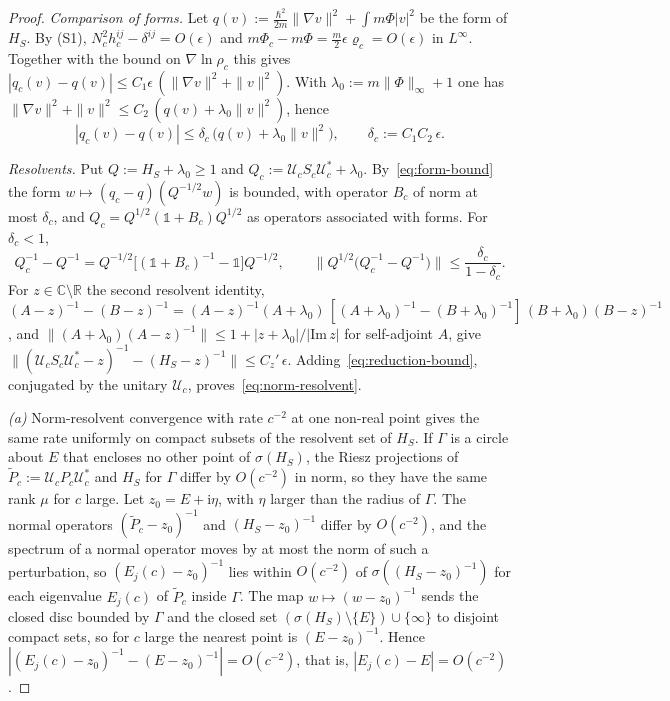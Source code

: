 \documentclass[%
 aip,
 jmp,
 amsmath,amssymb,
 reprint, onecolumn
]{revtex4-1}
\theoremstyle{definition}
\theoremstyle{remark}
\newcommand{\R}{\mathbb{R}}
\newcommand{\C}{\mathbb{C}}
\newcommand{\one}{\mathds{1}}
\newcommand{\rmi}{\mathrm{i}}
\begin{document}
\begin{proof}
\emph{Comparison of forms.} Let $q(v):=\frac{\hbar^2}{2m}\|\nabla v\|^2+
\int m\Phi|v|^2$ be the form of $H_S$. By (S1),
$N_c^2h_c^{ij}-\delta^{ij}=O(\epsilon)$ and $m\Phi_c-m\Phi=\frac m2
\epsilon\varrho_c=O(\epsilon)$ in $L^\infty$. Together with the bound
on $\nabla\ln\rho_c$ this gives $|q_c(v)-q(v)|\leq C_1\epsilon\,
(\|\nabla v\|^2+\|v\|^2)$. With $\lambda_0:=m\|\Phi\|_\infty+1$ one has
$\|\nabla v\|^2+\|v\|^2\leq C_2\,(q(v)+\lambda_0\|v\|^2)$, hence
\begin{equation}\label{eq:form-bound}
|q_c(v)-q(v)|\leq\delta_c\,\bigl(q(v)+\lambda_0\|v\|^2\bigr),\qquad
\delta_c:=C_1C_2\,\epsilon .
\end{equation}

\emph{Resolvents.} Put $Q:=H_S+\lambda_0\geq1$ and $Q_c:=\mathcal{U}_c
S_c\mathcal{U}_c^*+\lambda_0$. By~\eqref{eq:form-bound} the form
$w\mapsto(q_c-q)(Q^{-1/2}w)$ is bounded, with operator $B_c$ of norm at
most $\delta_c$, and $Q_c=Q^{1/2}(\one+B_c)Q^{1/2}$ as operators
associated with forms. For $\delta_c<1$,
\begin{equation}\label{eq:factorised-resolvent}
Q_c^{-1}-Q^{-1}=Q^{-1/2}\bigl[(\one+B_c)^{-1}-\one\bigr]Q^{-1/2},
\qquad
\bigl\|Q^{1/2}\bigl(Q_c^{-1}-Q^{-1}\bigr)\bigr\|\leq\frac{\delta_c}{1-\delta_c}.
\end{equation}
For $z\in\C\setminus\R$ the second resolvent identity,
$(A-z)^{-1}-(B-z)^{-1}=(A-z)^{-1}(A+\lambda_0)\,[(A+\lambda_0)^{-1}-(B+
\lambda_0)^{-1}]\,(B+\lambda_0)(B-z)^{-1}$, and $\|(A+\lambda_0)(A-z)^{-1}\|
\leq1+|z+\lambda_0|/|\mathrm{Im}\,z|$ for self-adjoint $A$, give
$\|(\mathcal{U}_cS_c\mathcal{U}_c^*-z)^{-1}-(H_S-z)^{-1}\|\leq C_z'\,
\epsilon$. Adding~\eqref{eq:reduction-bound}, conjugated by the unitary
$\mathcal{U}_c$, proves~\eqref{eq:norm-resolvent}.

\emph{(a)} Norm-resolvent convergence with rate $c^{-2}$ at one
non-real point gives the same rate uniformly on compact subsets of the
resolvent set of $H_S$. If $\Gamma$ is a circle about $E$ that encloses
no other point of $\sigma(H_S)$, the Riesz projections of
$\tilde P_c:=\mathcal{U}_cP_c\mathcal{U}_c^*$ and $H_S$ for $\Gamma$ differ
by $O(c^{-2})$ in norm, so they have the same rank $\mu$ for $c$ large.
Let $z_0=E+\rmi\eta$, with $\eta$ larger than the radius of $\Gamma$.
The normal operators $(\tilde P_c-z_0)^{-1}$ and $(H_S-z_0)^{-1}$ differ
by $O(c^{-2})$, and the spectrum of a normal operator moves by at most
the norm of such a perturbation, so $(E_j(c)-z_0)^{-1}$ lies within
$O(c^{-2})$ of $\sigma((H_S-z_0)^{-1})$ for each eigenvalue $E_j(c)$ of
$\tilde P_c$ inside $\Gamma$. The map $w\mapsto(w-z_0)^{-1}$ sends the
closed disc bounded by $\Gamma$ and the closed set $(\sigma(H_S)\setminus
\{E\})\cup\{\infty\}$ to disjoint compact sets, so for $c$ large the
nearest point is $(E-z_0)^{-1}$. Hence $|(E_j(c)-z_0)^{-1}-(E-z_0)^{-1}|=
O(c^{-2})$, that is, $|E_j(c)-E|=O(c^{-2})$.


\end{proof}
\end{document}
